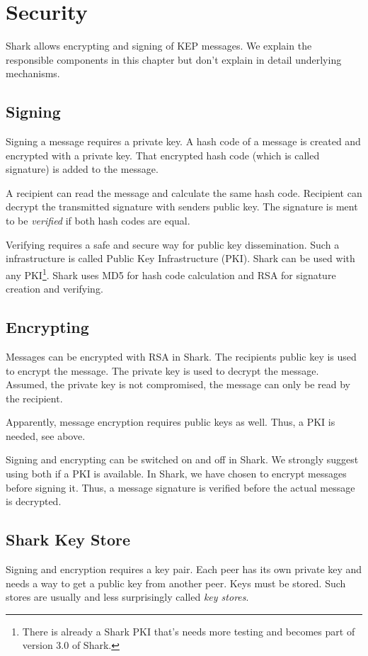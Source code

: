 \chapter{Security}
\label{sec:security}
Shark allows encrypting and signing of KEP messages. We explain the responsible components in this chapter but don't explain in detail underlying mechanisms.

\section{Signing}
Signing a message requires a private key. A hash code of a message is created and encrypted with a private key. That encrypted hash code (which is called signature) is added to the message.

A recipient can read the message and calculate the same hash code. Recipient can decrypt the transmitted signature with senders public key. The signature is ment to be {\it verified} if both hash codes are equal.

Verifying requires a safe and secure way for public key dissemination. Such a infrastructure is called Public Key Infrastructure (PKI). Shark can be used with any PKI\footnote{There is already a Shark PKI that's needs more testing and becomes part of version 3.0 of Shark.}. Shark uses MD5 for hash code calculation and RSA for signature creation and verifying.

\section{Encrypting}
Messages can be encrypted with RSA in Shark. The recipients public key is used to encrypt the message. The private key is used to decrypt the message. Assumed, the private key is not compromised, the message can only be read by the recipient.

Apparently, message encryption requires public keys as well. Thus, a PKI is needed, see above.

Signing and encrypting can be switched on and off in Shark. We strongly suggest using both if a PKI is available. In Shark, we have chosen to encrypt messages before signing it. Thus, a message signature is verified before the 
actual message is decrypted.

\section{Shark Key Store}
Signing and encryption requires a key pair. Each peer has its own private key and needs a way to get a public key from another peer. Keys must be stored. Such stores are usually and less surprisingly called {\it key stores}.

